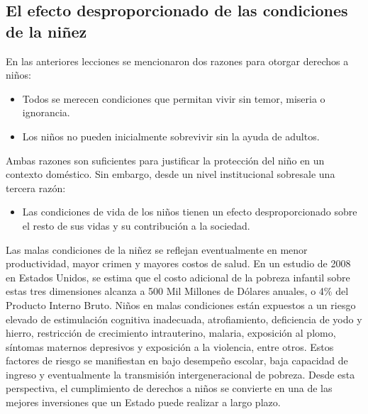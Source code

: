 \documentclass{tufte-handout}
\begin{document}
\bigskip

\subsection{El efecto desproporcionado de las condiciones de la niñez}\label{subsec:efecto}


En las anteriores lecciones se mencionaron dos razones para otorgar derechos a niños:

\begin{itemize}
\item{Todos se merecen condiciones que permitan vivir sin temor, miseria o ignorancia.}
\item{Los niños no pueden inicialmente sobrevivir sin la ayuda de adultos.}
\end{itemize}

Ambas razones son suficientes para justificar la protección del niño en un contexto doméstico. Sin embargo, desde un nivel institucional sobresale una tercera razón:

\begin{itemize}
\item{Las condiciones de vida de los niños tienen un efecto desproporcionado sobre el resto de sus vidas y su contribución a la sociedad.}
\end{itemize}

Las malas condiciones de la niñez se reflejan eventualmente en menor productividad, mayor crimen y mayores costos de salud. En un estudio de 2008 en Estados Unidos, se estima que el costo adicional de la pobreza infantil sobre estas tres dimensiones alcanza a 500 Mil Millones de Dólares anuales, o 4\% del Producto Interno Bruto. Niños en malas condiciones están expuestos a un riesgo elevado de estimulación cognitiva inadecuada, atrofiamiento, deficiencia de yodo y hierro, restricción de crecimiento intrauterino, malaria, exposición al plomo, síntomas maternos depresivos y exposición a la violencia, entre otros. Estos factores de riesgo se manifiestan en bajo desempeño escolar, baja capacidad de ingreso y eventualmente la transmisión intergeneracional de pobreza. Desde esta perspectiva, el cumplimiento de derechos a niños se convierte en una de las mejores inversiones que un Estado puede realizar a largo plazo.
\end{document}
